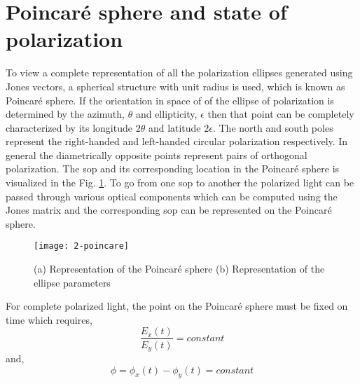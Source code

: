 \documentclass[../report.tex]{subfiles}
\begin{document}
		\section{Poincaré sphere and state of polarization} \label{concept:poincare_sphare}
To view a complete representation of all the polarization ellipses generated using Jones vectors, a spherical structure with unit radius is used, which is known as Poincaré sphere. If the orientation in space of of the ellipse of polarization is determined by the azimuth, $\theta$ and ellipticity, $\epsilon$ then that point can be completely characterized by its longitude $2\theta$ and latitude $2\epsilon$. The north and south poles represent the right-handed and left-handed circular polarization respectively. In general the diametrically opposite points represent pairs of orthogonal polarization. The \gls{sop} and its corresponding location in the Poincaré sphere is visualized in the Fig. \ref{fig:2_poincare}. To go from one \gls{sop} to another the polarized light can be passed through various optical components which can be computed using the Jones matrix and the corresponding \gls{sop} can be represented on the Poincaré sphere. 
     
\begin{figure}[H]
	\centering
	\texttt{[image: 2-poincare]}
	\caption{(a) Representation of the Poincaré sphere (b) Representation of the ellipse parameters \cite{flossmann_stokes_2006}}
	\label{fig:2_poincare}
\end{figure}
\noindent For complete polarized light, the point on the Poincaré sphere must be fixed on time which requires,
\begin{equation}\label{eq:polarization_condition_1}
\dfrac {E_{x}\left( t\right) } {E_{y}\left( t\right) }=constant
\end{equation}
and,
\begin{equation}\label{eq:polarization_condition_2}
\phi = \phi_{x}(t) - \phi_{y}(t)=constant
\end{equation}
  
\end{document}

